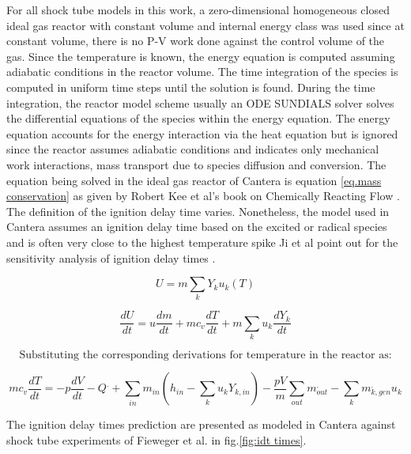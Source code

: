 For all shock tube models in this work, a zero-dimensional homogeneous closed ideal gas reactor with constant volume and internal energy class was used since at constant volume, there is no P-V work done against the control volume of the gas. Since the temperature is known, the energy equation is computed assuming adiabatic conditions in the reactor volume. The time integration of the species is computed in uniform time steps until the solution is found. During the time integration, the reactor model scheme usually an ODE SUNDIALS solver \cite{hindmarsh2005sundials} solves the differential equations of the species within the energy equation. The energy equation accounts for the energy interaction via the heat equation but is ignored since the reactor assumes adiabatic conditions and indicates only mechanical work interactions, mass transport due to species diffusion and conversion.  The equation being solved in the ideal gas reactor  of Cantera is equation \ref{eq.mass conservation} as given by Robert Kee et al's book on Chemically Reacting Flow \cite{Kee2003ChemicallyPractice}. The definition of the ignition delay time varies. Nonetheless, the model used in Cantera assumes an ignition delay time based on the excited  or  radical species and is often very close to the highest temperature spike Ji et al point out for the sensitivity analysis of ignition delay times \cite{Ji2019EvolutionAutoignition}. 

\begin{equation}
    U = m\sum_k{Y_k u_k(T)}
\end{equation}

\begin{equation}
    \frac{dU}{dt} = u\frac{dm}{dt}+mc_v\frac{dT}{dt}+m\sum_k{u_k \frac{dY_k}{dt}}
\end{equation}

\[\text{Substituting the corresponding derivations for temperature in the reactor as:} \]


\begin{equation}
    mc_v\frac{dT}{dt}=-p\frac{dV}{dt} - Q^. + \sum_{in}{m_{in}(h_{in}- \sum_k{u_k Y_{k, in}}) -\frac{pV}{m}\sum_{out}{m_{out}^.} - \sum_k{m_{k, gen}^. u_k}}
    \label{eq.mass conservation}
\end{equation}

The ignition delay times prediction are presented as modeled in Cantera against shock tube experiments of Fieweger et al.\cite{Fieweger1994Shock-tubePressures}\cite{Fieweger1997Self-ignitionPressure} in fig.\ref{fig:idt times}.

